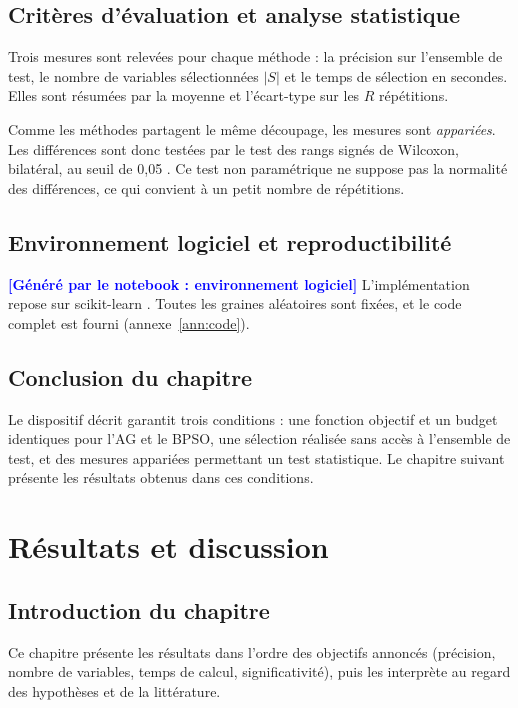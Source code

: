 \documentclass[11pt,a4paper]{report}
\newcommand{\attente}[1]{\textcolor{blue}{\textbf{[Généré par le notebook : #1]}}}
\newcommand{\Environnement}{\attente{environnement logiciel}}
\begin{document}
\section{Critères d'évaluation et analyse statistique}
Trois mesures sont relevées pour chaque méthode : la précision sur l'ensemble de test, le nombre
de variables sélectionnées $|S|$ et le temps de sélection en secondes. Elles sont résumées par la
moyenne et l'écart-type sur les $R$ répétitions.

Comme les méthodes partagent le même découpage, les mesures sont \emph{appariées}. Les différences
sont donc testées par le test des rangs signés de Wilcoxon, bilatéral, au seuil de 0,05
\cite{demsar2006}. Ce test non paramétrique ne suppose pas la normalité des différences, ce qui
convient à un petit nombre de répétitions.

\section{Environnement logiciel et reproductibilité}
\Environnement
L'implémentation repose sur scikit-learn \cite{sklearn}. Toutes les graines aléatoires sont
fixées, et le code complet est fourni (annexe~\ref{ann:code}).

\section{Conclusion du chapitre}
Le dispositif décrit garantit trois conditions : une fonction objectif et un budget identiques
pour l'AG et le BPSO, une sélection réalisée sans accès à l'ensemble de test, et des mesures
appariées permettant un test statistique. Le chapitre suivant présente les résultats obtenus dans
ces conditions.

\chapter{Résultats et discussion}
\label{chap:resultats}
\section{Introduction du chapitre}
Ce chapitre présente les résultats dans l'ordre des objectifs annoncés (précision, nombre de
variables, temps de calcul, significativité), puis les interprète au regard des hypothèses et de
la littérature.
\end{document}
